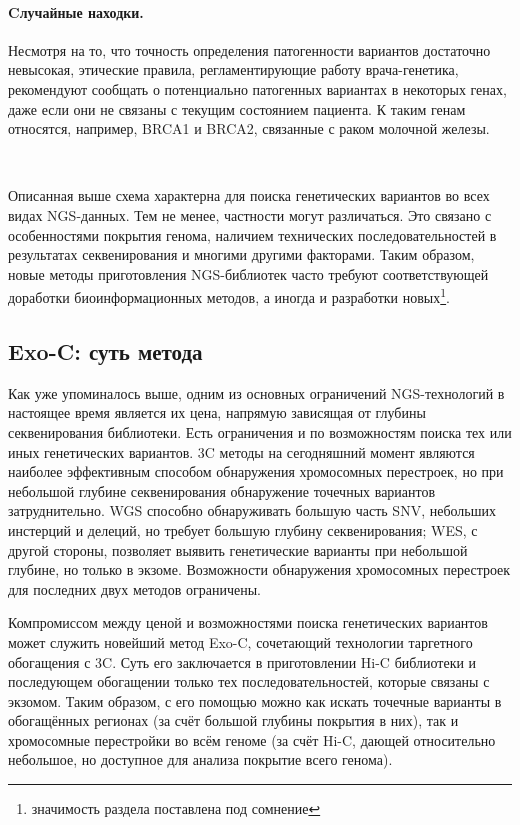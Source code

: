 \documentclass[a4paper,12pt]{article}
\begin{document}
\paragraph{Cлучайные находки.}
Несмотря на то, что точность определения патогенности вариантов достаточно невысокая, этические правила, регламентирующие работу врача-генетика, рекомендуют сообщать о потенциально патогенных вариантах в некоторых генах, даже если они не связаны с текущим состоянием пациента.
К таким генам относятся, например, BRCA1 и BRCA2, связанные с раком молочной железы.

~

Описанная выше схема характерна для поиска генетических вариантов во всех видах NGS-данных.
Тем не менее, частности могут различаться.
Это связано с особенностями покрытия генома, наличием технических последовательностей в результатах секвенирования и многими другими факторами.
Таким образом, новые методы приготовления NGS-библиотек часто требуют соответствующей доработки биоинформационных методов, а иногда и разработки новых\footnote{значимость раздела поставлена под сомнение}.

\subsection{Exo-C: суть метода}

Как уже упоминалось выше, одним из основных ограничений NGS-технологий в настоящее время является их цена, напрямую зависящая от глубины секвенирования библиотеки.
Есть ограничения и по возможностям поиска тех или иных генетических вариантов.
3C методы на сегодняшний момент являются наиболее эффективным способом обнаружения хромосомных перестроек, но при небольшой глубине секвенирования обнаружение точечных вариантов затруднительно.
WGS способно обнаруживать большую часть SNV, небольших инстерций и делеций, но требует большую глубину секвенирования; WES, с другой стороны, позволяет выявить генетические варианты при небольшой глубине, но только в экзоме.
Возможности обнаружения хромосомных перестроек для последних двух методов ограничены.

Компромиссом между ценой и возможностями поиска генетических вариантов может служить новейший метод Exo-C, сочетающий технологии таргетного обогащения с 3C.
Суть его заключается в приготовлении Hi-C библиотеки и последующем обогащении только тех последовательностей, которые связаны с экзомом.
Таким образом, с его помощью можно как искать точечные варианты в обогащённых регионах (за счёт большой глубины покрытия в них), так и хромосомные перестройки во всём геноме (за счёт Hi-C, дающей относительно небольшое, но доступное для анализа покрытие всего генома)\cite{mozheiko}.
\end{document}
